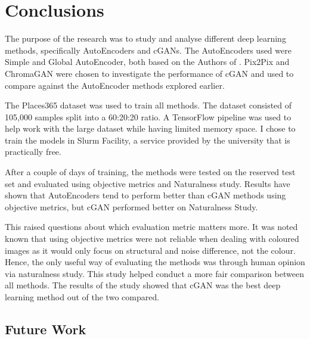 \chapter{Conclusions}
The purpose of the research was to study and analyse different deep learning methods, specifically AutoEncoders and cGANs. The AutoEncoders used were Simple and Global AutoEncoder, both based on the Authors of \cite{deepkoal2017}. Pix2Pix and ChromaGAN were chosen to investigate the performance of cGAN and used to compare against the AutoEncoder methods explored earlier. 

The Places365 dataset was used to train all methods. The dataset consisted of 105,000 samples split into a 60:20:20 ratio. A TensorFlow pipeline was used to help work with the large dataset while having limited memory space. I chose to train the models in Slurm Facility, a service provided by the university that is practically free. 

After a couple of days of training, the methods were tested on the reserved test set and evaluated using objective metrics and Naturalness study. Results have shown that AutoEncoders tend to perform better than cGAN methods using objective metrics, but cGAN performed better on Naturalness Study. 

This raised questions about which evaluation metric matters more. It was noted known that using objective metrics were not reliable when dealing with coloured images as it would only focus on structural and noise difference, not the colour. Hence, the only useful way of evaluating the methods was through human opinion via naturalness study. This study helped conduct a more fair comparison between all methods. The results of the study showed that cGAN was the best deep learning method out of the two compared.









\section{Future Work}
